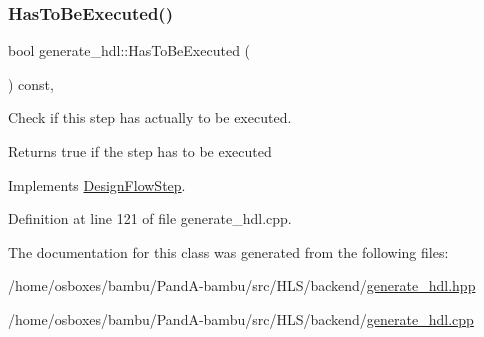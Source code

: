 \subsubsection{\texorpdfstring{Has\+To\+Be\+Executed()}{HasToBeExecuted()}}
{\footnotesize\ttfamily bool generate\+\_\+hdl\+::\+Has\+To\+Be\+Executed (\begin{DoxyParamCaption}{ }\end{DoxyParamCaption}) const\hspace{0.3cm}{\ttfamily [override]}, {\ttfamily [virtual]}}



Check if this step has actually to be executed. 

\begin{DoxyReturn}{Returns}
true if the step has to be executed 
\end{DoxyReturn}


Implements \hyperlink{classDesignFlowStep_a1783abe0c1d162a52da1e413d5d1ef05}{Design\+Flow\+Step}.



Definition at line 121 of file generate\+\_\+hdl.\+cpp.



The documentation for this class was generated from the following files\+:\begin{DoxyCompactItemize}
\item 
/home/osboxes/bambu/\+Pand\+A-\/bambu/src/\+H\+L\+S/backend/\hyperlink{generate__hdl_8hpp}{generate\+\_\+hdl.\+hpp}\item 
/home/osboxes/bambu/\+Pand\+A-\/bambu/src/\+H\+L\+S/backend/\hyperlink{generate__hdl_8cpp}{generate\+\_\+hdl.\+cpp}\end{DoxyCompactItemize}
